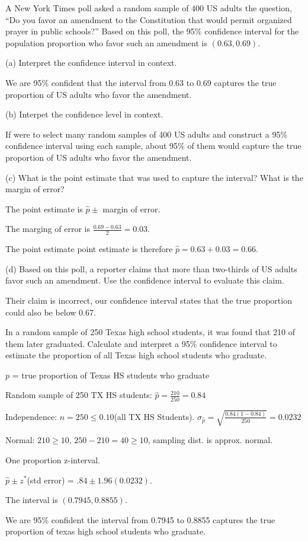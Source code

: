 \documentclass[../stats.tex]{subfiles}
\begin{document}
\begin{example}
    A New York Times poll asked a random sample of 400 US adults the question, ``Do you favor an amendment to the Constitution that would permit organized prayer in public schools?'' Based on this poll, the 95\% confidence interval for the population proportion who favor such an amendment is $(0.63,0.69)$.

    (a) Interpret the confidence interval in context.

    We are 95\% confident that the interval from 0.63 to 0.69 captures the true proportion of US adults who favor the amendment.

    (b) Interpet the confidence level in context.

    If were to select many random samples of 400 US adults and construct a 95\% confidence interval using each sample, about 95\% of them would capture the true proportion of US adults who favor the amendment.

    (c) What is the point estimate that was used to capture the interval? What is the margin of error?

    The point estimate is $\hat{p} \pm$ margin of error.

    The marging of error is $\frac{0.69-0.63}{2}=0.03$.

    The point estimate point estimate is therefore $\hat{p}=0.63+0.03=0.66$.

    (d) Based on this poll, a reporter claims that more than two-thirds of US adults favor such an amendment. Use the confidence interval to evaluate this claim.

    Their claim is incorrect, our confidence interval states that the true proportion could also be below 0.67.
\end{example}

\pagebreak
\begin{example}
    In a random sample of 250 Texas high school students, it was found that 210 of them later graduated. Calculate and interpret a 95\% confidence interval to estimate the proportion of all Texas high school students who graduate.

    $p$ = true proportion of Texas HS students who graduate 

    Random sample of 250 TX HS students: $\hat{p}=\frac{210}{250}=0.84$

    Independence: $n=250\leq 0.10$(all TX HS Students). $\sigma_{\hat{p}}=\sqrt{\frac{0.84(1-0.84)}{250}}=0.0232$

    Normal: $210\geq 10$, $250-210=40\geq 10$, sampling dist. is approx. normal.

    One proportion z-interval.

    $\hat{p}\pm z^*$(std error) = $.84\pm 1.96(0.0232)$. 

    The interval is $(0.7945, 0.8855)$. 

    We are 95\% confident the interval from 0.7945 to 0.8855 captures the true proportion of texas high school students who graduate.
\end{example}
\end{document}
